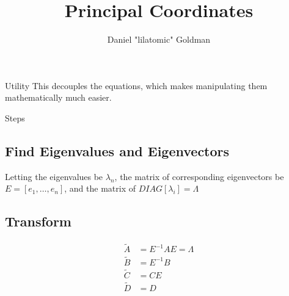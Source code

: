 \documentclass{../templates/topic}
\title{Principal Coordinates}
\author{Daniel "lilatomic" Goldman}
\begin{document}
\maketitle
\begin{section}{Utility}
	This decouples the equations, which makes manipulating them mathematically much easier.
\end{section}

\begin{section}{Steps}
	\subsection{Find Eigenvalues and Eigenvectors}
		Letting the eigenvalues be $\lambda_n$, the matrix of corresponding eigenvectors be $E=[e_1, \dots, e_n]$, and the matrix of $DIAG[\lambda_i]=\Lambda$
		
	\subsection{Transform}
	\begin{align}
		\tilde{A} &= E^{-1}AE = \Lambda \\
		\tilde{B} &= E^{-1}B \\
		\tilde{C} &= CE \\
		\tilde{D} &= D
	\end{align}
\end{section}
	
\end{document}
